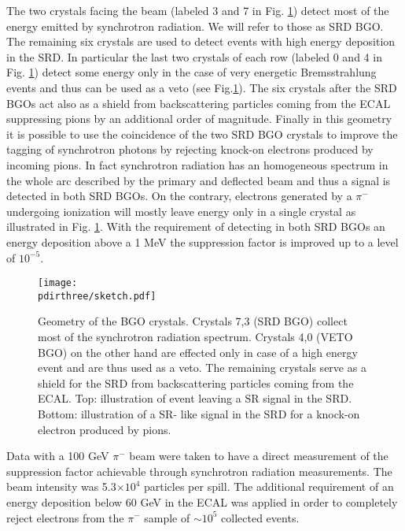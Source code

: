 The two crystals facing the beam (labeled 3 and 7 in Fig. \ref{fig:newgeo}) detect most of the energy emitted by synchrotron radiation. We will refer to those as SRD BGO. The remaining six crystals are used to detect events with high energy deposition in the SRD. In particular the last two crystals of each row (labeled 0 and 4 in Fig. \ref{fig:newgeo}) detect some energy only in the case of very energetic Bremsstrahlung events and thus can be used as a veto (see Fig.\ref{fig:newgeo}). The six crystals after the SRD BGOs act also as a shield from backscattering particles coming from the ECAL suppressing pions by an additional order of magnitude. Finally in this geometry it is possible to use the coincidence of the two SRD BGO crystals to improve the tagging of synchrotron photons by rejecting knock-on electrons produced by incoming pions. In fact synchrotron radiation has an homogeneous spectrum in the whole arc described by the primary and deflected beam and thus a signal is detected in both SRD BGOs. On the contrary, electrons generated by a $\pi^-$ undergoing ionization will mostly leave energy only in a single crystal as illustrated in Fig. \ref{fig:newgeo}. 
With the requirement of detecting in both SRD BGOs an energy deposition above a 1 MeV the suppression factor is improved up to a level of $10^{-5}$.



\begin{figure}[htb!]
  \centering
  \texttt{[image: \\pdirthree/sketch.pdf]}
  \caption[Geometry of the BGO crystals]{Geometry of the BGO crystals. Crystals 7,3 (SRD BGO) collect most of the synchrotron radiation spectrum. Crystals 4,0 (VETO BGO) on the other hand are effected only in case of a high energy event and are thus used as a veto. The remaining crystals serve as a shield for the SRD from backscattering particles coming from the ECAL. Top: illustration of event leaving a SR signal in the SRD. Bottom: illustration of a SR- like signal in the SRD for a knock-on electron produced by pions.}
\label{fig:newgeo}
\end{figure}

Data with a 100 GeV $\pi^-$ beam were taken to have a direct measurement of the suppression factor achievable through synchrotron radiation measurements. The beam intensity was 5.3$\times 10^4$ particles per spill. The additional requirement of an energy deposition below 60 GeV in the ECAL was applied in order to completely reject electrons from the $\pi^-$ sample of $\sim 10^5$ collected events.

